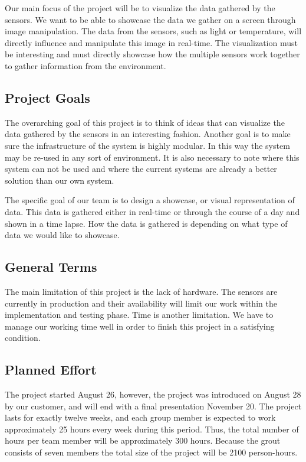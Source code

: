 \documentclass[../document.tex]{subfiles}
\begin{document}
Our main focus of the project will be to visualize the data gathered by the sensors. We want to be able to showcase the data we gather on a screen through image manipulation. The data from the sensors, such as light or temperature, will directly influence and manipulate this image in real-time. The visualization must be interesting and must directly showcase how the multiple sensors work together to gather information from the environment.

\subsection{Project Goals}
The overarching goal of this project is to think of ideas that can visualize the data gathered by the sensors in an interesting fashion. Another goal is to make sure the infrastructure of the system is highly modular. In this way the system may be re-used in any sort of environment. It is also necessary to note where this system can not be used and where the current systems are already a better solution than our own system.

The specific goal of our team is to design a showcase, or visual representation of data. This data is gathered either in real-time or through the course of a day and shown in a time lapse. How the data is gathered is depending on what type of data we would like to showcase. 

\subsection{General Terms}
The main limitation of this project is the lack of hardware. The sensors are currently in production and their availability will limit our work within the implementation and testing phase. Time is another limitation. We have to manage our working time well in order to finish this project in a satisfying condition.

\subsection{Planned Effort}
The project started August 26, however, the project was introduced on August 28 by our customer, and will end with a final presentation November 20. The project lasts for exactly twelve weeks, and each group member is expected to work approximately 25 hours every week during this period. Thus, the total number of hours per team member will be approximately 300 hours. Because the grout consists of seven members the total size of the project will be 2100 person-hours. 
\end{document}
